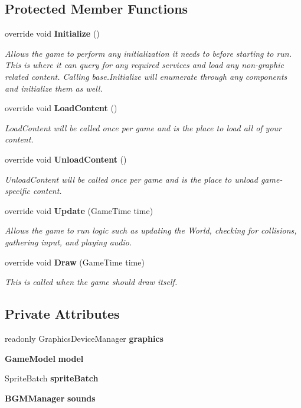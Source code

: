 \subsection*{Protected Member Functions}
\begin{DoxyCompactItemize}
\item 
override void \textbf{ Initialize} ()
\begin{DoxyCompactList}\small\item\em Allows the game to perform any initialization it needs to before starting to run. This is where it can query for any required services and load any non-\/graphic related content. Calling base.\+Initialize will enumerate through any components and initialize them as well. \end{DoxyCompactList}\item 
override void \textbf{ Load\+Content} ()
\begin{DoxyCompactList}\small\item\em Load\+Content will be called once per game and is the place to load all of your content. \end{DoxyCompactList}\item 
override void \textbf{ Unload\+Content} ()
\begin{DoxyCompactList}\small\item\em Unload\+Content will be called once per game and is the place to unload game-\/specific content. \end{DoxyCompactList}\item 
override void \textbf{ Update} (Game\+Time time)
\begin{DoxyCompactList}\small\item\em Allows the game to run logic such as updating the World, checking for collisions, gathering input, and playing audio. \end{DoxyCompactList}\item 
override void \textbf{ Draw} (Game\+Time time)
\begin{DoxyCompactList}\small\item\em This is called when the game should draw itself. \end{DoxyCompactList}\end{DoxyCompactItemize}
\subsection*{Private Attributes}
\begin{DoxyCompactItemize}
\item 
readonly Graphics\+Device\+Manager \textbf{ graphics}
\item 
\textbf{ Game\+Model} \textbf{ model}
\item 
Sprite\+Batch \textbf{ sprite\+Batch}
\item 
\textbf{ B\+G\+M\+Manager} \textbf{ sounds}
\end{DoxyCompactItemize}



